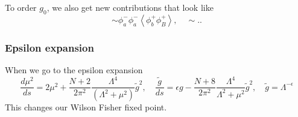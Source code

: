 To order $ g _ 0 $, we also get new contributions that look like 
\[
 \sim \phi _ a ^ - \phi _ a ^ - \left< \phi_ b ^ + \phi _ B ^ +   \right>, \quad 
 \sim ..
\] 
\subsubsection{Epsilon expansion} 
When we go to the epsilon expansion 
\[
	\frac{ d \mu ^ 2 }{ ds } = 2 \mu ^ 2 + \frac{N + 2 }{ 2 \pi ^ 2 } \frac{ \Lambda ^ 4 }{ 
	( \Lambda ^ 2 + \mu ^ 2 ) } \tilde{ g } ^ 2, \quad 
	\frac{ \tilde{ g }  }{ ds }  = \epsilon g  - \frac{ N +  8 }{  2 \pi ^ 2 }  \frac{ \Lambda ^ 4 }{ 
	\Lambda ^ 2+ \mu ^ 2 } \tilde{ g } ^ 2, \quad \tilde{ g }  = \Lambda ^{ - \epsilon }  
\] This changes our Wilson Fisher fixed point. 
